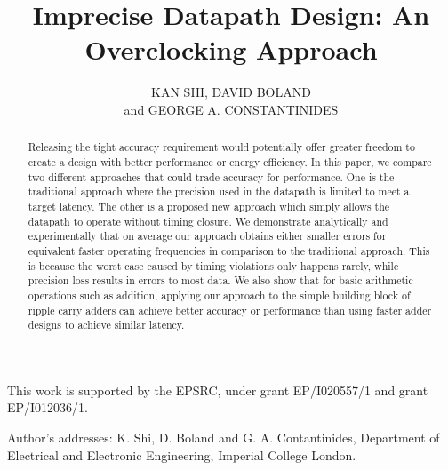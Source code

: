 \documentclass[prodmode,acmtrets]{acmsmall} %
\begin{document}

\title{Imprecise Datapath Design: An Overclocking Approach}
\author{KAN SHI, DAVID BOLAND\\
and GEORGE A. CONSTANTINIDES
}


\begin{abstract}
Releasing the tight accuracy requirement would potentially offer greater freedom to create a design with better performance or energy efficiency. In this paper, we compare two different approaches that could trade accuracy for performance. One is the traditional approach where the precision used in the datapath is limited to meet a target latency. The other is a proposed new approach which simply allows the datapath to operate without timing closure. We demonstrate analytically and experimentally that on average our approach obtains either smaller errors for equivalent faster operating frequencies in comparison to the traditional approach. This is because the worst case caused by timing violations only happens rarely, while precision loss results in errors to most data. We also show that for basic arithmetic operations such as addition, applying our approach to the simple building block of ripple carry adders can achieve better accuracy or performance than using faster adder designs to achieve similar latency.

\end{abstract}





\begin{bottomstuff}
This work is supported by the EPSRC, under
grant EP/I020557/1 and grant EP/I012036/1.

Author's addresses: K. Shi, D. Boland {and} G. A. Contantinides,
Department of Electrical and Electronic Engineering,
Imperial College London.
\end{bottomstuff}
\end{document}
